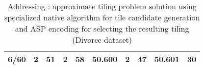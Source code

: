 \begin{table}[]
\begin{tabular}{rrrrrrrrrr}
6/60                                           & 2                                       & 51                                          & 2                      & 58                         & 50.600                    & 2                                           & 47                                              & 50.601                                         & 30                          \\ \hline                         
\end{tabular}
\caption{Addressing \qsix: approximate tiling problem  solution using specialized native algorithm for tile candidate generation and ASP encoding for selecting the resulting tiling (Divorce dataset)}
\label{til:div}
\normalsize
\end{table}


